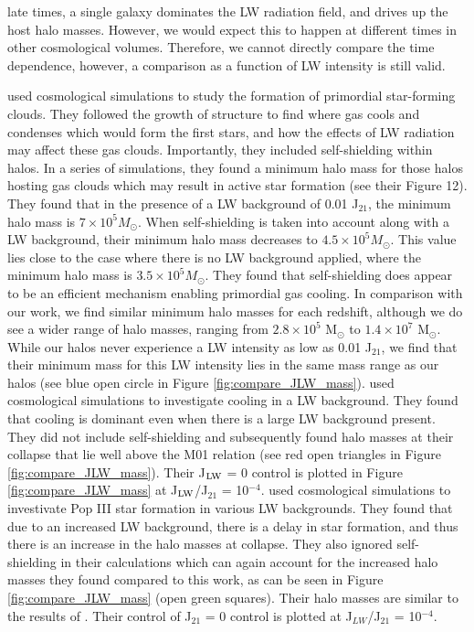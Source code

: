 \documentclass[fleqn,usenatbib]{mnras}
\begin{document}
late times, a single galaxy dominates the LW radiation field, and drives up the host halo masses. However, we would expect this to happen at different times in other cosmological volumes. Therefore, we cannot directly compare the time dependence, however, a comparison as a function of LW intensity is still valid. 

\citet{Yoshida03} used cosmological simulations to study the formation of primordial star-forming clouds. They followed the growth of structure to find where gas cools and condenses which would form the first stars, and how the effects of LW radiation may affect these gas clouds. Importantly, they included \hh{} self-shielding within halos. In a series of simulations, they found a minimum halo mass for those halos hosting gas clouds which may result in active star formation (see their Figure 12). They found that in the presence of a LW background of 0.01 J$_{21}$, the minimum halo mass is $7 \times 10^{5} M_{\odot}$. When \hh{} self-shielding is taken into account along with a LW background, their minimum halo mass decreases to $4.5 \times 10^{5} M_{\odot}$. This value lies close to the case where there is no LW background applied, where the minimum halo mass is $3.5 \times 10^{5} M_{\odot}$. They found that \hh{} self-shielding does appear to be an efficient mechanism enabling primordial gas cooling. In comparison with our work, we find similar minimum halo masses for each redshift, although we do see a wider range of halo masses, ranging from $2.8 \times 10^{5}$ M$_{\odot}$ to $1.4 \times 10^{7}$ M$_{\odot}$. While our halos never experience a LW intensity as low as 0.01 J$_{21}$, we find that their minimum mass for this LW intensity lies in the same mass range as our halos (see blue open circle in Figure \ref{fig:compare_JLW_mass}). \citet{Wise07_UVB} used cosmological simulations to investigate \hh{} cooling in a LW background. They found that \hh{} cooling is dominant even when there is a large LW background present. They did not include self-shielding and subsequently found halo masses at their collapse that lie well above the M01 relation (see red open triangles in Figure \ref{fig:compare_JLW_mass}). Their J$_{\rm LW}$ = 0 control is plotted in Figure \ref{fig:compare_JLW_mass} at J$_{\rm LW}$/J$_{21}$ = 10$^{-4}$. \citet{OShea08} used cosmological simulations to investivate Pop III star formation in various LW backgrounds. They found that due to an increased LW background, there is a delay in star formation, and thus there is an increase in the halo masses at collapse. They also ignored \hh{} self-shielding in their calculations which can again account for the increased halo masses they found compared to this work, as can be seen in Figure \ref{fig:compare_JLW_mass} (open green squares). Their halo masses are similar to the results of \citet{Wise07_UVB}. Their control of J$_{21}$ = 0 control is plotted at J$_{LW}$/J$_{21}$ = 10$^{-4}$.
\end{document}
